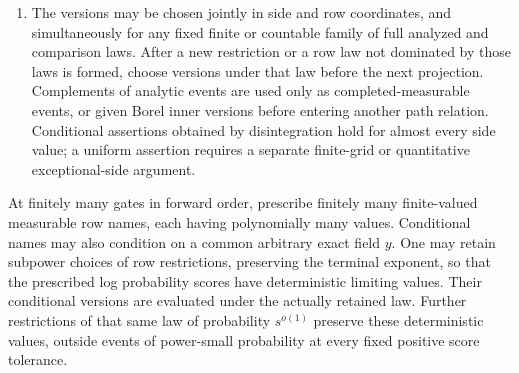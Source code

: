 \begin{lemma}
\begin{enumerate}[label=\textup{(\roman*)}]
\item The versions may be chosen jointly in side and row coordinates,
and simultaneously for any fixed finite or countable family of full
analyzed and comparison laws. After a new restriction or a row law not
dominated by those laws is formed, choose versions under that law before
the next projection. Complements of analytic events are used only as
completed-measurable events, or given Borel inner versions before
entering another path relation. Conditional assertions obtained by
disintegration hold for almost every side value; a uniform assertion
requires a separate finite-grid or quantitative exceptional-side
argument.
\end{enumerate}
\end{lemma}


\begin{lemma}\label{cyl:flattening}
At finitely many gates in forward order, prescribe finitely many
finite-valued measurable row names, each having polynomially many
values.  Conditional names may also condition on a common arbitrary
exact field $y$.  One may retain subpower choices of row restrictions,
preserving the terminal exponent, so that the prescribed log probability
scores have deterministic limiting values.  Their conditional versions
are evaluated under the actually retained law.  Further restrictions
of that same law of probability $s^{o(1)}$ preserve these deterministic
values, outside events of power-small probability at every fixed
positive score tolerance.
\end{lemma}

